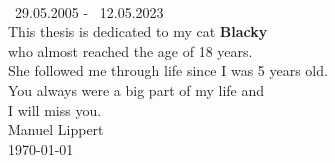 \thispagestyle{empty}

\begin{center}
    \vspace*{3cm}
    \vspace{2cm}\\
    \gtrsymBorn~29.05.2005 - \gtrsymDied~12.05.2023\\
    \bigskip
    This thesis is dedicated to my cat \textbf{Blacky}\\ who almost reached the age of 18 years.\\ She followed me through life since I was 5 years old.\\You always were a big part of my life and\\ 
    \bigskip
    I will miss you.\\
    \bigskip
    Manuel Lippert\\
    \today
\end{center}